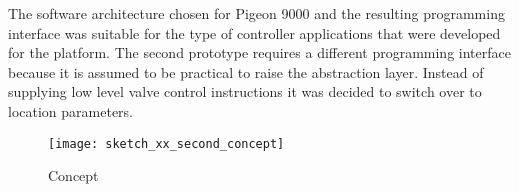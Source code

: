 The software architecture chosen for Pigeon 9000 and the resulting programming interface was suitable for the type of controller applications that were developed for the platform. The second prototype requires a different programming interface because it is assumed to be practical to raise the abstraction layer. Instead of supplying low level valve control instructions it was decided to switch over to location parameters.

\begin{figure}[h]
\centering

\texttt{[image: sketch\_xx\_second\_concept]}

\caption{Concept}
\end{figure}